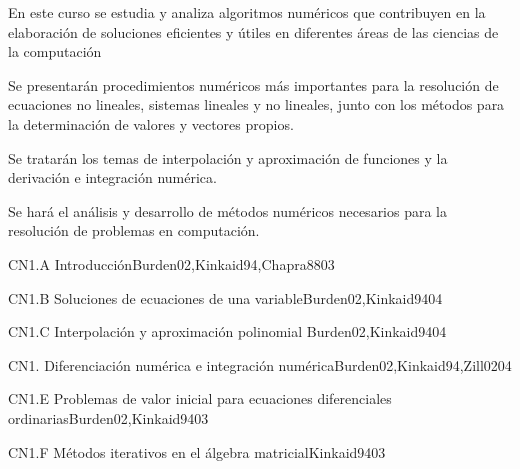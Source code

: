 
\begin{syllabus}


\begin{justification}
   En este curso se estudia y analiza algoritmos numéricos que
   contribuyen en la elaboración de soluciones eficientes y útiles en
   diferentes áreas de las ciencias de la computación
   \end{justification}
   
   \begin{goals}
   \item Se presentarán procedimientos numéricos más importantes para la resolución de 
   ecuaciones no lineales, sistemas lineales y no lineales, junto con los métodos 
   para la determinación de valores y vectores propios.
   
   \item Se tratarán los temas de interpolación y aproximación de funciones y la 
   derivación e integración numérica.
   
   \item Se hará el análisis y desarrollo de métodos numéricos necesarios para la 
   resolución de problemas en computación.
   \end{goals}
   

   
   \begin{unit}{CN1.A Introducción}{}{Burden02,Kinkaid94,Chapra88}{0}{3}
   \end{unit}
   
   \begin{unit}{CN1.B Soluciones de ecuaciones de una variable}{}{Burden02,Kinkaid94}{0}{4}
   \end{unit}
   
   \begin{unit}{CN1.C Interpolación y aproximación polinomial }{}{Burden02,Kinkaid94}{0}{4}
   \end{unit}
   
   \begin{unit}{CN1. Diferenciación numérica e integración numérica}{}{Burden02,Kinkaid94,Zill02}{0}{4}
   \end{unit}
   
   \begin{unit}{CN1.E Problemas de valor inicial para ecuaciones diferenciales ordinarias}{}{Burden02,Kinkaid94}{0}{3}
   \end{unit}
   
   \begin{unit}{CN1.F Métodos iterativos en el álgebra matricial}{}{Kinkaid94}{0}{3}
   \end{unit}
   
   
   
   \begin{coursebibliography}
   \end{coursebibliography}
   
   \end{syllabus}
   
   
